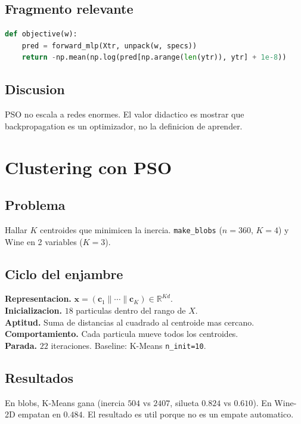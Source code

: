 \documentclass[11pt,oneside]{article}
\begin{document}
\subsection{Fragmento relevante}
\begin{lstlisting}[language=Python,caption={Forward sin backward.}]
def objective(w):
    pred = forward_mlp(Xtr, unpack(w, specs))
    return -np.mean(np.log(pred[np.arange(len(ytr)), ytr] + 1e-8))
\end{lstlisting}

\subsection{Discusion}
PSO no escala a redes enormes. El valor didactico es mostrar que backpropagation es un optimizador, no la definicion de aprender.

\section{Clustering con PSO}
\subsection{Problema}
Hallar $K$ centroides que minimicen la inercia. \texttt{make\_blobs} ($n=360$, $K=4$) y Wine en 2 variables ($K=3$).

\subsection{Ciclo del enjambre}
\begin{cajateal}
\textbf{Representacion.} $\mathbf{x}=(\mathbf{c}_1\|\cdots\|\mathbf{c}_K)\in\mathbb{R}^{Kd}$.\\[3pt]
\textbf{Inicializacion.} $18$ particulas dentro del rango de $X$.\\[3pt]
\textbf{Aptitud.} Suma de distancias al cuadrado al centroide mas cercano.\\[3pt]
\textbf{Comportamiento.} Cada particula mueve todos los centroides.\\[3pt]
\textbf{Parada.} $22$ iteraciones. Baseline: K-Means \texttt{n\_init=10}.
\end{cajateal}

\subsection{Resultados}
En blobs, K-Means gana (inercia $504$ vs $2407$, silueta $0.824$ vs $0.610$). En Wine-2D empatan en $0.484$. El resultado es util porque no es un empate automatico.
\end{document}
